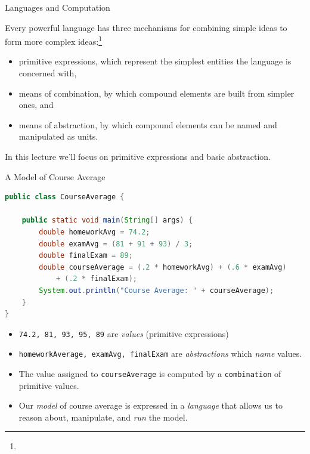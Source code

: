 \documentclass{beamer}
\begin{document}
\begin{frame}[fragile]{Languages and Computation}

Every powerful language has three mechanisms for  combining simple ideas to form more complex ideas:\footnote{}

\begin{itemize}
\item primitive expressions, which represent the simplest entities the language is concerned with,

\item means of combination, by which compound elements are built from simpler ones, and

\item means of abstraction, by which compound elements can be named and manipulated as units.
\end{itemize}

In this lecture we'll focus on primitive expressions and basic abstraction.

\end{frame}

\begin{frame}[fragile]{A Model of Course Average}
\vspace{-.05in}
\begin{lstlisting}[language=Java]
public class CourseAverage {

    public static void main(String[] args) {
        double homeworkAvg = 74.2;
        double examAvg = (81 + 91 + 93) / 3;
        double finalExam = 89;
        double courseAverage = (.2 * homeworkAvg) + (.6 * examAvg)
            + (.2 * finalExam);
        System.out.println("Course Average: " + courseAverage);
    }
}
\end{lstlisting}
\vspace{-.05in}
\begin{itemize}
\item {\tt 74.2, 81, 93, 95, 89} are {\it values} (primitive expressions)
\item {\tt homeworkAverage, examAvg, finalExam} are {\it abstractions} which {\it name} values.
\item The value assigned to {\tt courseAverage} is computed by a {\tt combination} of primitive values.
\item Our {\it model} of course average is expressed in a {\it language} that allows us to reason about, manipulate, and {\it run} the model.
\end{itemize}

\end{frame}
\end{document}

